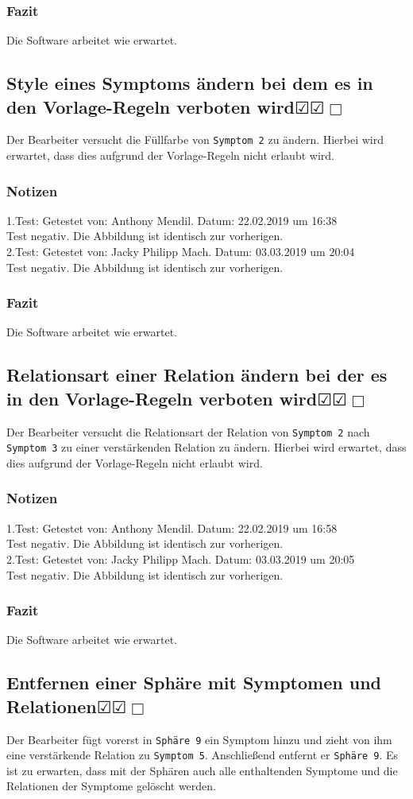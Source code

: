 \documentclass[enabledeprecatedfontcommands]{scrartcl}
\newcommand{\subsectiont}[2]{\subsection[#1]{#1{\normalsize\normalfont #2}}}
\newcommand{\leer}{$\Box$}
\newcommand{\ok}{$\CheckedBox$}
\begin{document}
\subsubsection{Fazit}
Die Software arbeitet wie erwartet.

\subsectiont{Style eines Symptoms ändern bei dem es in den Vorlage-Regeln verboten wird}{\dotfill\ok\ok\leer}
Der Bearbeiter versucht die Füllfarbe von \texttt{Symptom 2} zu ändern. Hierbei wird erwartet, dass dies aufgrund der Vorlage-Regeln nicht erlaubt wird.
\subsubsection{Notizen}
1.Test: Getestet von: Anthony Mendil. Datum: 22.02.2019 um 16:38 \\
Test negativ. Die Abbildung ist identisch zur vorherigen.\\
2.Test: Getestet von: Jacky Philipp Mach. Datum: 03.03.2019 um 20:04 \\
Test negativ. Die Abbildung ist identisch zur vorherigen.
\subsubsection{Fazit}
Die Software arbeitet wie erwartet.

\subsectiont{Relationsart einer Relation ändern bei der es in den Vorlage-Regeln verboten wird}{\dotfill\ok\ok\leer}
Der Bearbeiter versucht die Relationsart der Relation von \texttt{Symptom 2} nach \texttt{Symptom 3} zu einer verstärkenden Relation zu ändern. Hierbei wird erwartet, dass dies aufgrund der Vorlage-Regeln nicht erlaubt wird.
\subsubsection{Notizen}
1.Test: Getestet von: Anthony Mendil. Datum: 22.02.2019 um 16:58 \\
Test negativ. Die Abbildung ist identisch zur vorherigen.\\
2.Test: Getestet von: Jacky Philipp Mach. Datum: 03.03.2019 um 20:05 \\
Test negativ. Die Abbildung ist identisch zur vorherigen.
\subsubsection{Fazit}
Die Software arbeitet wie erwartet.

\subsectiont{Entfernen einer Sphäre mit Symptomen und Relationen}{\dotfill\ok\ok\leer}
Der Bearbeiter fügt vorerst in \texttt{Sphäre 9} ein Symptom hinzu und zieht von ihm eine verstärkende Relation zu \texttt{Symptom 5}. Anschließend entfernt er \texttt{Sphäre 9}. Es ist zu erwarten, dass mit der Sphären auch alle enthaltenden Symptome und die Relationen der Symptome gelöscht werden. 
\end{document}
